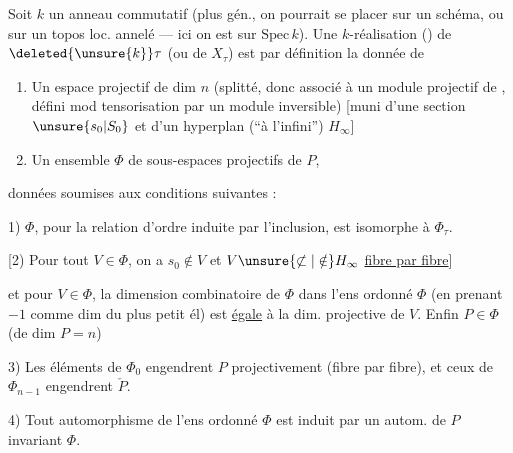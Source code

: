 Soit $k$ un anneau commutatif (plus gén., on pourrait se placer sur un schéma, ou sur un topos loc. annelé --- ici on est sur $\mathrm{Spec}\,k$). Une $k$-réalisation () de $\deleted{\unsure{k}}\tau$ (ou de $X_\tau$) est par définition la donnée de

\begin{enumerate}[label=\alph*)]
\item Un espace projectif  de dim $n$ (splitté, donc associé à un module projectif de , défini mod tensorisation par un module inversible) [muni d'une section $\unsure{s_0|S_0}$  et d'un hyperplan (``à l'infini'') $H_\infty$]
\item Un ensemble $\Phi$ de sous-espaces projectifs de $P$,
\end{enumerate}
données soumises aux conditions suivantes :

1) $\Phi$, pour la relation d'ordre induite par l'inclusion, est isomorphe à $\Phi_\tau$.

[2)  Pour tout $V\in\Phi$, on a $s_0\notin V$ et $V\unsure{\not\subset|\notin}H_\infty$ \uline{fibre par fibre}]

et pour $V\in\Phi$, la dimension combinatoire de $\Phi$ dans l'ens ordonné $\Phi$ (en prenant $-1$ comme dim du plus petit él) est \uline{égale} à la dim. projective de $V$.  Enfin $P\in\Phi$ (de dim $P=n$)

3)  Les éléments de $\Phi_0$ engendrent $P$ projectivement (fibre par fibre), et ceux de $\Phi_{n-1}$ engendrent $\check P$.


4) Tout automorphisme de l'ens ordonné $\Phi$ est induit par un autom. de $P$ invariant $\Phi$.

